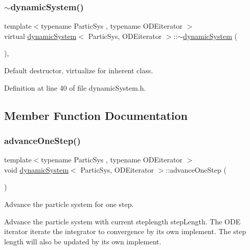 \subsubsection{\texorpdfstring{$\sim$dynamic\+System()}{~dynamicSystem()}}
{\footnotesize\ttfamily template$<$typename Partic\+Sys , typename O\+D\+Eiterator $>$ \\
virtual \mbox{\hyperlink{classdynamic_system}{dynamic\+System}}$<$ Partic\+Sys, O\+D\+Eiterator $>$\+::$\sim$\mbox{\hyperlink{classdynamic_system}{dynamic\+System}} (\begin{DoxyParamCaption}{ }\end{DoxyParamCaption})\hspace{0.3cm}{\ttfamily [inline]}, {\ttfamily [virtual]}}



Default destructor, virtualize for inherent class. 



Definition at line 40 of file dynamic\+System.\+h.



\subsection{Member Function Documentation}
\mbox{\label{classdynamic_system_a7a4032c043dd0286007f4d7c542d3f95}} 
\subsubsection{\texorpdfstring{advance\+One\+Step()}{advanceOneStep()}}
{\footnotesize\ttfamily template$<$typename Partic\+Sys , typename O\+D\+Eiterator $>$ \\
void \mbox{\hyperlink{classdynamic_system}{dynamic\+System}}$<$ Partic\+Sys, O\+D\+Eiterator $>$\+::advance\+One\+Step (\begin{DoxyParamCaption}{ }\end{DoxyParamCaption})\hspace{0.3cm}{\ttfamily [inline]}}



Advance the particle system for one step. 

Advance the particle system with current steplength step\+Length. The O\+DE iterator iterate the integrator to convergence by its own implement. The step length will also be updated by its own implement. 

